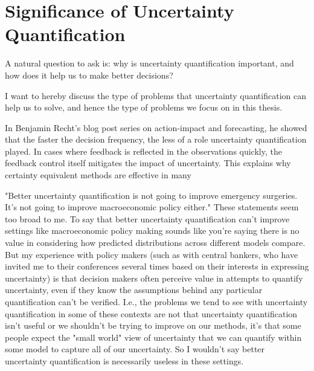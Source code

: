 \section{Significance of Uncertainty Quantification}

A natural question to ask is: why is uncertainty quantification important, and how does it help us to make better decisions?


I want to hereby discuss the type of problems that uncertainty quantification can help us to solve, and hence the type of problems we focus on in this thesis.

In Benjamin Recht's \cite{recht2025uncertainty} blog post series on action-impact and forecasting, he showed that the faster the decision frequency, the less of a role uncertainty quantification played. In cases where feedback is reflected in the observations quickly, the feedback control itself mitigates the impact of uncertainty. This explains why certainty equivalent methods are effective in many 



"Better uncertainty quantification is not going to improve emergency surgeries. It’s not going to improve macroeconomic policy either." These statements seem too broad to me. To say that better uncertainty quantification can't improve settings like macroeconomic policy making sounds like you're saying there is no value in considering how predicted distributions across different models compare. But my experience with policy makers (such as with central bankers, who have invited me to their conferences several times based on their interests in expressing uncertainty) is that decision makers often perceive value in attempts to quantify uncertainty, even if they know the assumptions behind any particular quantification can't be verified. I.e., the problems we tend to see with uncertainty quantification in some of these contexts are not that uncertainty quantification isn't useful or we shouldn't be trying to improve on our methods, it's that some people expect the "small world" view of uncertainty that we can quantify within some model to capture all of our uncertainty. So I wouldn't say better uncertainty quantification is necessarily useless in these settings.

